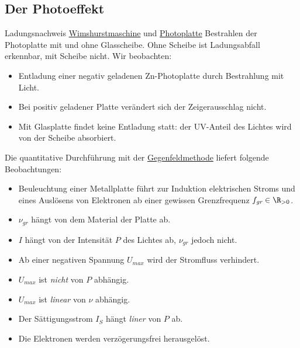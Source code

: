\documentclass{article}
\begin{document}
    \subsection{Der Photoeffekt}\label{subsec:Photoeffekt}
    
    \begin{Experiment}{Ladungsnachweis \href{https://de.wikipedia.org/wiki/Wimshurstmaschine}{Wimshurstmaschine} und \href{https://de.wikipedia.org/wiki/Fotoplatte}{Photoplatte}}
        Bestrahlen der Photoplatte mit und ohne Glasscheibe. Ohne Scheibe ist Ladungsabfall erkennbar, mit Scheibe nicht. Wir beobachten:
        \begin{itemize}
            \item Entladung einer negativ geladenen Zn-Photoplatte durch Bestrahlung mit Licht.
            \item Bei positiv geladener Platte verändert sich der Zeigerausschlag nicht. 
            \item Mit Glasplatte findet keine Entladung statt: der UV-Anteil des Lichtes wird von der Scheibe absorbiert.
        \end{itemize}
        Die quantitative Durchführung mit der \href{https://www.leifiphysik.de/quantenphysik/quantenobjekt-photon/versuche/h-bestimmung-mit-der-gegenfeldmethode}{Gegenfeldmethode} liefert folgende Beobachtungen:
        \begin{itemize}
            \item Beuleuchtung einer Metallplatte führt zur Induktion elektrischen Stroms und eines Auslösens von Elektronen ab einer gewissen Grenzfrequenz $f_\textit{gr}\in\R_{>0}$. 
            \item $\nu_\textit{gr}$ hängt von dem Material der Platte ab.
            \item $I$ hängt von der Intensität $P$ des Lichtes ab, $\nu_\textit{gr}$ jedoch nicht. 
            \item Ab einer negativen Spannung $U_\textit{max}$ wird der Stromfluss verhindert.
            \item $U_\textit{max}$ ist \emph{nicht} von $P$ abhängig. 
            \item $U_\textit{max}$ ist \emph{linear} von $\nu$ abhängig.
            \item Der Sättigungsstrom $I_S$ hängt \emph{liner} von $P$ ab.
            \item Die Elektronen werden verzögerungsfrei herausgelöst. 

\end{itemize}
\end{Experiment}
\end{document}
